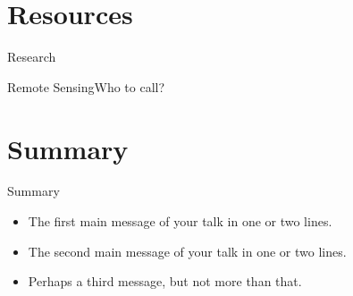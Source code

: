\documentclass[11pt]{beamer}
\begin{document}
\section{Resources}
\begin{frame}{Research}

\end{frame}

\begin{frame}{Remote Sensing}{Who to call?}

\end{frame}


\section*{Summary}
\begin{frame}{Summary}

  \begin{itemize}
  \item
    The \alert{first main message} of your talk in one or two lines.
  \item
    The \alert{second main message} of your talk in one or two lines.
  \item
    Perhaps a \alert{third message}, but not more than that.
  \end{itemize}
\end{frame}
\end{document}
